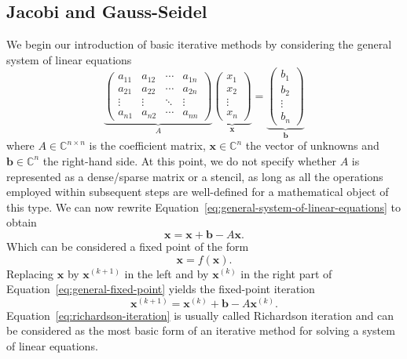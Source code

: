 \subsection{Jacobi and Gauss-Seidel} 
We begin our introduction of basic iterative methods by considering the general system of linear equations
\begin{equation}
	\underbrace{
	\begin{pmatrix}a_{11}&a_{12}&\cdots &a_{1n}\\a_{21}&a_{22}&\cdots &a_{2n}\\\vdots &\vdots &\ddots &\vdots \\a_{n1}&a_{n2}&\cdots &a_{nn}\end{pmatrix}}_{A}
\underbrace{\begin{pmatrix}
		x_1 \\ x_2 \\ \vdots \\ x_n
\end{pmatrix}}_{\bm{x}} = 
\underbrace{\begin{pmatrix}
		b_1 \\ b_2 \\ \vdots \\ b_n
\end{pmatrix}}_{\bm{b}}
	\label{eq:general-system-of-linear-equations}
\end{equation}
where $A \in \mathbb{C}^{n \times n}$ is the coefficient matrix, $\bm x \in \mathbb{C}^n$ the vector of unknowns and $\bm b \in \mathbb{C}^n$ the right-hand side.
At this point, we do not specify whether $A$ is represented as a dense/sparse matrix or a stencil, as long as all the operations employed within subsequent steps are well-defined for a mathematical object of this type.
We can now rewrite Equation~\eqref{eq:general-system-of-linear-equations} to obtain
\begin{equation}
	\bm{x} = \bm{x} + \bm{b} - A \bm{x}.
	\label{eq:general-fixed-point}
\end{equation}
Which can be considered a fixed point of the form
\begin{equation}
	\bm x = f(\bm x).
\end{equation} 
Replacing $\bm x$ by $\bm{x}^{(k+1)}$ in the left and by $\bm{x}^{(k)}$ in the right part of Equation~\eqref{eq:general-fixed-point} yields the fixed-point iteration
\begin{equation}
	\bm{x}^{(k+1)} = \bm{x}^{(k)} + \bm b - A \bm{x}^{(k)}.
	\label{eq:richardson-iteration}
\end{equation}
Equation~\eqref{eq:richardson-iteration} is usually called Richardson iteration and can be considered as the most basic form of an iterative method for solving a system of linear equations.

